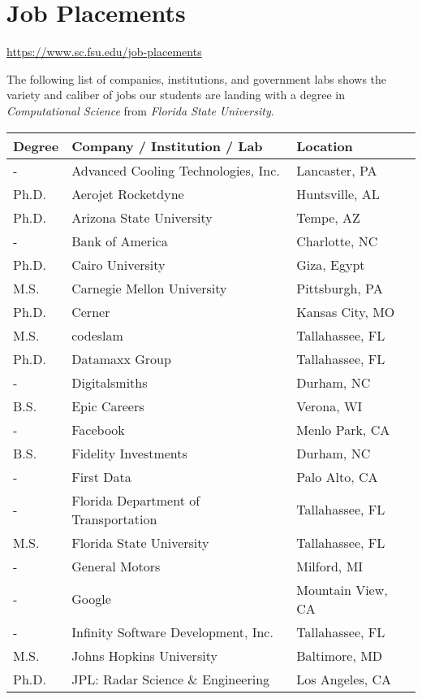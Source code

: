\documentclass[12pt,a4paper]{article}
\begin{document}
\section{Job Placements}
\url{https://www.sc.fsu.edu/job-placements}

The following list of companies, institutions, and government labs shows the variety and caliber of jobs our students are landing with a degree in \textit{Computational Science} from \textit{Florida State University}.

\begin{center}
\onehalfspacing
\begin{tabular}{l p{8cm} l}
\rowcolor{gray!25}
\textbf{Degree} & \textbf{Company / Institution / Lab} & \textbf{Location} \\ 
\hline \hline
- & Advanced Cooling Technologies, Inc. & Lancaster, PA \\
Ph.D. & Aerojet Rocketdyne & Huntsville, AL \\
Ph.D. & Arizona State University & Tempe, AZ \\
- & Bank of America & Charlotte, NC \\
Ph.D. & Cairo University & Giza, Egypt \\
M.S. & Carnegie Mellon University & Pittsburgh, PA \\
Ph.D. & Cerner & Kansas City, MO \\
M.S. & codeslam & Tallahassee, FL \\
Ph.D. & Datamaxx Group & Tallahassee, FL \\
- & Digitalsmiths & Durham, NC \\
B.S. & Epic Careers & Verona, WI \\
- & Facebook & Menlo Park, CA \\
B.S. & Fidelity Investments & Durham, NC \\
- & First Data & Palo Alto, CA \\
- & Florida Department of Transportation & Tallahassee, FL \\
M.S. & Florida State University & Tallahassee, FL \\
- & General Motors & Milford, MI \\
- & Google & Mountain View, CA \\
- & Infinity Software Development, Inc. & Tallahassee, FL \\
M.S. & Johns Hopkins University & Baltimore, MD \\
Ph.D. & JPL: Radar Science \& Engineering & Los Angeles, CA \\

\end{tabular}
\end{center}
\end{document}
